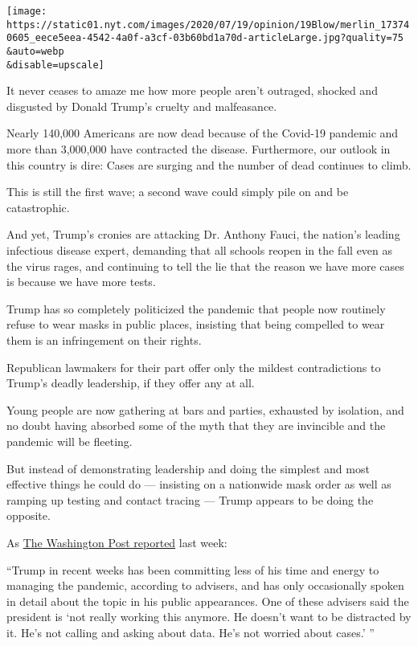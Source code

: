 \texttt{[image: https://static01.nyt.com/images/2020/07/19/opinion/19Blow/merlin\_173740605\_eece5eea-4542-4a0f-a3cf-03b60bd1a70d-articleLarge.jpg?quality=75\\\&auto=webp\\\&disable=upscale]}

It never ceases to amaze me how more people aren't outraged, shocked and
disgusted by Donald Trump's cruelty and malfeasance.

Nearly 140,000 Americans are now dead because of the Covid-19 pandemic
and more than 3,000,000 have contracted the disease. Furthermore, our
outlook in this country is dire: Cases are surging and the number of
dead continues to climb.

This is still the first wave; a second wave could simply pile on and be
catastrophic.

And yet, Trump's cronies are attacking Dr. Anthony Fauci, the nation's
leading infectious disease expert, demanding that all schools reopen in
the fall even as the virus rages, and continuing to tell the lie that
the reason we have more cases is because we have more tests.

Trump has so completely politicized the pandemic that people now
routinely refuse to wear masks in public places, insisting that being
compelled to wear them is an infringement on their rights.

Republican lawmakers for their part offer only the mildest
contradictions to Trump's deadly leadership, if they offer any at all.

Young people are now gathering at bars and parties, exhausted by
isolation, and no doubt having absorbed some of the myth that they are
invincible and the pandemic will be fleeting.

But instead of demonstrating leadership and doing the simplest and most
effective things he could do --- insisting on a nationwide mask order as
well as ramping up testing and contact tracing --- Trump appears to be
doing the opposite.

As
\href{https://www.washingtonpost.com/politics/rancor-between-scientists-and-trump-allies-threatens-pandemic-response-as-cases-surge/2020/07/17/d950e9b6-c777-11ea-a99f-3bbdffb1af38_story.html}{The
Washington Post reported} last week:

``Trump in recent weeks has been committing less of his time and energy
to managing the pandemic, according to advisers, and has only
occasionally spoken in detail about the topic in his public appearances.
One of these advisers said the president is `not really working this
anymore. He doesn't want to be distracted by it. He's not calling and
asking about data. He's not worried about cases.' ''

